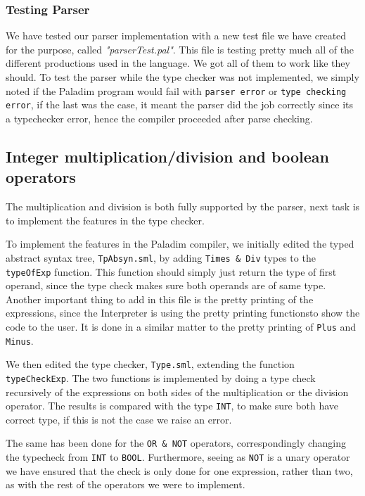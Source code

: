 \documentclass[10pt]{article}
\begin{document}
\subsubsection{Testing Parser}
We have tested our parser implementation with a new test file we have created for the purpose, called \textit{"parserTest.pal"}. This file is testing pretty much all of the different productions used in the language. We got all of them to work like they should. To test the parser while the type checker was not implemented, we simply noted if the Paladim program would fail with \texttt{parser error} or \texttt{type checking error}, if the last was the case, it meant the parser did the job correctly since its a typechecker error, hence the compiler proceeded after parse checking.

\subsection{Integer multiplication/division and boolean operators}
The multiplication and division is both fully supported by the parser, next task is to implement the features in the type checker.

To implement the features in the Paladim compiler, we initially edited the typed abstract syntax tree, \texttt{TpAbsyn.sml}, by adding \texttt{Times \& Div} types to the \texttt{typeOfExp} function. This function should simply just return the type of first operand, since the type check makes sure both operands are of same type. Another important thing to add in this file is the pretty printing of the expressions, since the Interpreter is using the pretty printing functionsto show the code to the user. It is done in a similar matter to the pretty printing of \texttt{Plus} and \texttt{Minus}.

We then edited the type checker, \texttt{Type.sml}, extending the function \texttt{typeCheckExp}. The two functions is implemented by doing a type check recursively of the expressions on both sides of the multiplication or the division operator. The results is compared with the type \texttt{INT}, to make sure both have correct type, if this is not the case we raise an error.

The same has been done for the \texttt{OR \& NOT} operators, correspondingly changing the typecheck from \texttt{INT} to \texttt{BOOL}. Furthermore, seeing as \texttt{NOT} is a unary operator we have ensured that the check is only done for one expression, rather than two, as with the rest of the operators we were to implement.
\end{document}
